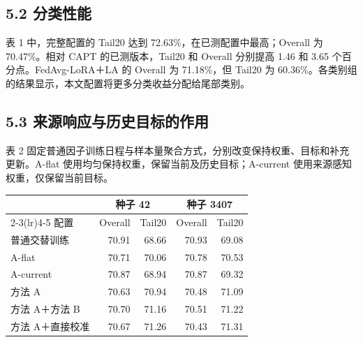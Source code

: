 \documentclass[10pt,twocolumn,letterpaper]{article}
\begin{document}
\subsection*{5.2 分类性能}

表 1 中，完整配置的 Tail20 达到 72.63\%，在已测配置中最高；Overall 为 70.47\%。相对 CAPT 的已测版本，Tail20 和 Overall 分别提高 1.46 和 3.65 个百分点。FedAvg-LoRA＋LA 的 Overall 为 71.18\%，但 Tail20 为 60.36\%。各类别组的结果显示，本文配置将更多分类收益分配给尾部类别。


\subsection*{5.3 来源响应与历史目标的作用}

表 2 固定普通因子训练日程与样本量聚合方式，分别改变保持权重、目标和补充更新。A-flat 使用均匀保持权重，保留当前及历史目标；A-current 使用来源感知权重，仅保留当前目标。


\par\medskip\noindent\begin{minipage}{\columnwidth}\centering{}\small\setlength{\tabcolsep}{3pt}

\begin{tabularx}{\columnwidth}{Xrrrr}\toprule & \multicolumn{2}{c}{种子 42} & \multicolumn{2}{c}{种子 3407} \\ \cmidrule(lr){2-3}\cmidrule(lr){4-5} 配置 & Overall & Tail20 & Overall & Tail20 \\\midrule

普通交替训练 & 70.91 & 68.66 & 70.93 & 69.08 \\

A-flat & 70.71 & 70.06 & 70.78 & 70.53 \\

A-current & 70.87 & 68.94 & 70.87 & 69.32 \\

方法 A & 70.63 & 70.94 & 70.48 & 71.09 \\

方法 A＋方法 B & 70.70 & 71.16 & 70.51 & 71.22 \\

方法 A＋直接校准 & 70.67 & 71.26 & 70.43 & 71.31 \\

\bottomrule\end{tabularx}\end{minipage}\par\medskip
\end{document}

